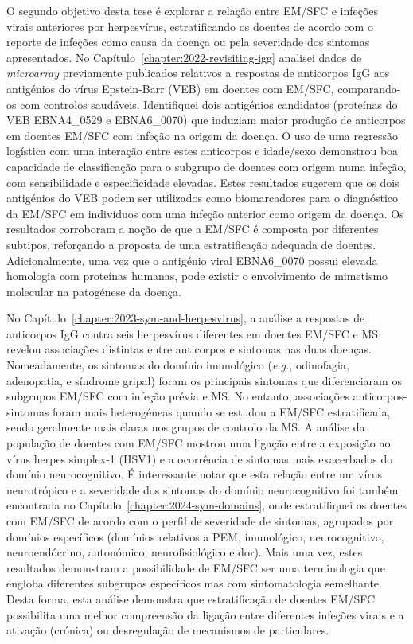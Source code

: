 O segundo objetivo desta tese é explorar a relação entre EM/SFC e infeções virais anteriores por herpesvírus, estratificando os doentes de acordo com o reporte de infeções como causa da doença ou pela severidade dos sintomas apresentados. No Capítulo~\ref{chapter:2022-revisiting-igg} analisei dados de \textit{microarray} previamente publicados relativos a respostas de anticorpos IgG aos antigénios do vírus Epstein-Barr (VEB) em doentes com EM/SFC, comparando-os com controlos saudáveis. Identifiquei dois antigénios candidatos (proteínas do VEB EBNA4\_0529 e EBNA6\_0070) que induziam maior produção de anticorpos em doentes EM/SFC com infeção na origem da doença. O uso de uma regressão logística com uma interação entre estes anticorpos e idade/sexo demonstrou boa capacidade de classificação para o subgrupo de doentes com origem numa infeção, com sensibilidade e especificidade elevadas. Estes resultados sugerem que os dois antigénios do VEB podem ser utilizados como biomarcadores para o diagnóstico da EM/SFC em indivíduos com uma infeção anterior como origem da doença. Os resultados corroboram a noção de que a EM/SFC é composta por diferentes subtipos, reforçando a proposta de uma estratificação adequada de doentes. Adicionalmente, uma vez que o antigénio viral EBNA6\_0070 possui elevada homologia com proteínas humanas, pode existir o envolvimento de mimetismo molecular na patogénese da doença.

No Capítulo~\ref{chapter:2023-sym-and-herpesvirus}, a análise a respostas de anticorpos IgG contra seis herpesvírus diferentes em doentes EM/SFC e MS revelou associações distintas entre anticorpos e sintomas nas duas doenças. Nomeadamente, os sintomas do domínio imunológico (\textit{e.g.}, odinofagia, adenopatia, e síndrome gripal) foram os principais sintomas que diferenciaram os subgrupos EM/SFC com infeção prévia e MS. No entanto, associações anticorpos-sintomas foram mais heterogéneas quando se estudou a EM/SFC estratificada, sendo geralmente mais claras nos grupos de controlo da MS. A análise da população de doentes com EM/SFC mostrou uma ligação entre a exposição ao vírus herpes simplex-1 (HSV1) e a ocorrência de sintomas mais exacerbados do domínio neurocognitivo. É interessante notar que esta relação entre um vírus neurotrópico e a severidade dos sintomas do domínio neurocognitivo foi também encontrada no Capítulo~\ref{chapter:2024-sym-domains}, onde estratifiquei os doentes com EM/SFC de acordo com o perfil de severidade de sintomas, agrupados por domínios específicos (domínios relativos a PEM, imunológico, neurocognitivo, neuroendócrino, autonómico, neurofisiológico e dor). Mais uma vez, estes resultados demonstram a possibilidade de EM/SFC ser uma terminologia que engloba diferentes subgrupos específicos mas com sintomatologia semelhante. Desta forma, esta análise demonstra que estratificação de doentes EM/SFC possibilita uma melhor compreensão da ligação entre diferentes infeções virais e a ativação (crónica) ou desregulação de mecanismos de particulares.

